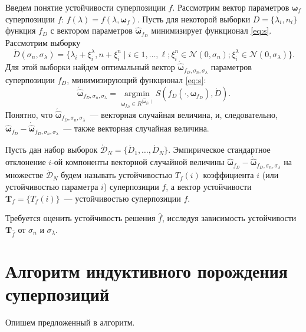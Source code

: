 \documentclass[12pt,a4paper]{article}
\begin{document}
Введем понятие устойчивости суперпозиции $f$. Рассмотрим вектор параметров
$\boldsymbol{\omega}_f$ суперпозиции $f$: $f(\lambda) = f(\lambda, \boldsymbol{\omega}_f)$.
Пусть для некоторой выборки $D = \{ \lambda_i, n_i \}$ функция $f_D$ с
вектором параметров $\hat{\boldsymbol{\omega}}_{f_D}$ минимизирует
функционал \eqref{eq:s}. Рассмотрим выборку
\begin{equation}
  \acute{D}(\sigma_n, \sigma_{\lambda}) = \{ \lambda_i + \xi^{\lambda}_i, n + \xi^n_i \mid i \in 1, \dots, \ell; \xi^n_i \in \mathcal{N}(0, \sigma_n); \xi^{\lambda}_i \in \mathcal{N}(0, \sigma_{\lambda}) \}.
  \label{eq:d_acute}
\end{equation}
Для этой выборки найдем оптимальный вектор $\acute{\hat{\boldsymbol{\omega}}}_{f_D, \sigma_n, \sigma_{\lambda}}$
параметров суперпозиции $f_D$, минимизирующий функционал \eqref{eq:s}:
\begin{equation}
  \acute{\hat{\boldsymbol{\omega}}}_{f_D, \sigma_n, \sigma_{\lambda}} = \mathop{\arg \min}\limits_{\boldsymbol{\omega}_{f_D} \in R^{\mid \hat{\boldsymbol{\omega}}_{f_D} \mid}} S (f_D (\cdot, \boldsymbol{\omega}_{f_D}), \acute{D}).
  \label{eq:hat_omega}
\end{equation}
Понятно, что $\acute{\hat{\boldsymbol{\omega}}}_{f_D, \sigma_n, \sigma_{\lambda}}$~---
векторная случайная величина, и, следовательно,
$\hat{\boldsymbol{\omega}}_{f_D} - \acute{\hat{\boldsymbol{\omega}}}_{f_D, \sigma_n, \sigma_{\lambda}}$~---
также векторная случайная величина.

Пусть дан набор выборок $\acute{\mathcal{D}}_N = \{ \acute{D}_1, \dots, \acute{D}_N \}$. Эмпирическое
стандартное отклонение $i$-ой компоненты векторной случайной величины
$\hat{\boldsymbol{\omega}}_{f_D} - \acute{\hat{\boldsymbol{\omega}}}_{f_D, \sigma_n, \sigma_{\lambda}}$
на множестве $\acute{\mathcal{D}}_N$ будем называть устойчивостью $T_f(i)$ коэффициента $i$
(или устойчивостью параметра $i$) суперпозиции $f$, а вектор устойчивости
$\mathbf{T}_f = \{ T_f(i) \}$~--- устойчивостью суперпозиции $f$.

Требуется оценить устойчивость решения $\hat{f}$, исследуя зависимость
устойчивости $\mathbf{T}_{\hat{f}}$ от $\sigma_n$ и $\sigma_{\lambda}$.

\section{Алгоритм индуктивного порождения суперпозиций}

Опишем предложенный в \cite{Rudoy13} алгоритм.
\end{document}
